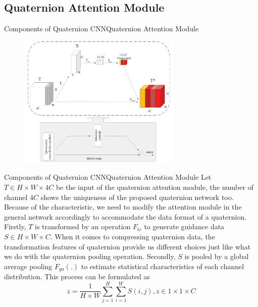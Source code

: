 \documentclass{beamer}
\begin{document}
\subsection{Quaternion Attention Module}
\begin{frame}{Components of Quaternion CNN}{Quaternion Attention Module}
    \begin{figure}[H]
        \centering
        \includegraphics[width=0.7\textwidth]{img/4.jpg}
    \end{figure}
\end{frame}
\begin{frame}{Components of Quaternion CNN}{Quaternion Attention Module}
Let $T\in H\times W\times 4C$ be the input of the quaternion attention module, the number of channel $4C$ shows the uniqueness of the proposed quaternion network too. Because of the
characteristic, we need to modify the attention module in the
general network accordingly to accommodate the data format
of a quaternion. Firstly, $T$ is transformed by an operation $F_{tr}$ to generate guidance data $S\in H\times W\times C$. When it
comes to compressing quaternion data, the transformation
features of quaternion provide us different choices just like
what we do with the quaternion pooling operation. Secondly, $S$ is pooled by a global average pooling $F_{ga}(.)$ to estimate
statistical characteristics of each channel distribution. This
process can be formulated as
\begin{equation}
    z=\frac{1}{H\times W}\sum_{j=1}^H\sum_{i=1}^W S(i,j), z\in 1\times 1\times C
\end{equation}
\end{frame}
\end{document}
